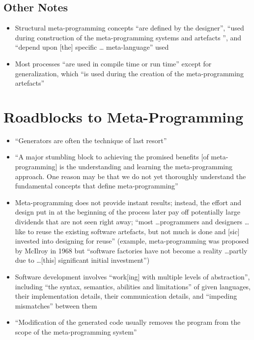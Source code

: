 \subsection{Other Notes}
\begin{itemize}
      \item Structural meta-programming concepts ``are defined by the
            designer'', ``used during construction of the meta-programming
            systems and artefacts '', and ``depend upon [the] specific \dots
            meta-language'' used \cite[p.~24]{stuikys_taxonomy_2013}
      \item Most processes ``are used in compile time or run time'' except for
            generalization, which ``is used during the creation of the
            meta-programming artefacts'' \cite[p.~24-25]{stuikys_taxonomy_2013}
\end{itemize}

\section{Roadblocks to Meta-Programming}
\label{chap:notes:sec:metaprogramming-roadblocks}
\begin{itemize}
      \item ``Generators are often the technique of last resort''
            \cite[p.~2]{smaragdakis_structured_2017}
      \item ``A major stumbling block to achieving the promised benefits
                  [of meta-programming] is the understanding and learning the
            meta-programming approach. One reason may be that we do not yet
            thoroughly understand the fundamental concepts that define
            meta-programming'' \cite[p.~26]{stuikys_taxonomy_2013}
      \item Meta-programming does not provide instant results; instead, the
            effort and design put in at the beginning of the process later pay
            off potentially large dividends that are not seen right away;
            ``most \dots programmers and designers \dots like to reuse the
            existing software artefacts, but not much is done and [sic]
            invested into designing for reuse'' \cite[p.~26]{stuikys_taxonomy_2013}
            (example, meta-programming was proposed by McIlroy in 1968 but
            ``software factories have not become a reality \dots partly due to
            \dots [this] significant initial investment'')
            \cite[p.~27]{stuikys_taxonomy_2013}
      \item Software development involves ``work[ing] with multiple levels of
            abstraction'', including ``the syntax, semantics, abilities and
            limitations'' of given languages, their implementation details,
            their communication details, and ``impeding mismatches'' between
            them \cite[p.~27]{stuikys_taxonomy_2013}
      \item ``Modification of the generated code usually removes the program
            from the scope of the meta-programming system''
            \cite[p.~27]{stuikys_taxonomy_2013}
\end{itemize}

